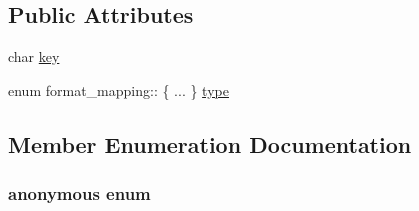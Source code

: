 \subsection*{Public Attributes}
\begin{DoxyCompactItemize}
\item 
char \hyperlink{structformat__mapping_ac83422062a85cba1360b399e195d379e}{key}
\item 
enum format\-\_\-mapping\-:: \{ ... \}  \hyperlink{structformat__mapping_a1aab006db73daa8daa3352cde804fcef}{type}
\end{DoxyCompactItemize}


\subsection{Member Enumeration Documentation}
\hypertarget{structformat__mapping_a64140d7a8e9af45156f6c4e81dabb506}{\subsubsection[{anonymous enum}]{\setlength{\rightskip}{0pt plus 5cm}anonymous enum}}\label{structformat__mapping_a64140d7a8e9af45156f6c4e81dabb506}
